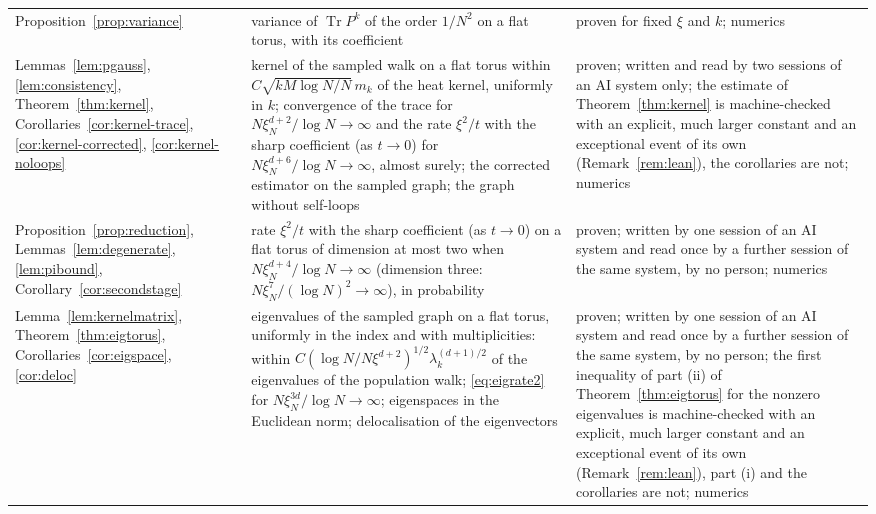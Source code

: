 \documentclass[11pt,a4paper]{article}
\theoremstyle{stmt}
\theoremstyle{defn}
\theoremstyle{rmk}
\numberwithin{equation}{section}
\DeclareMathOperator{\Tr}{Tr}
\begin{document}
{\begin{longtable}{@{}>{\raggedright\arraybackslash}p{}>{\raggedright\arraybackslash}p{}>{\raggedright\arraybackslash}p{}@{}}
Proposition~\ref{prop:variance} & variance of $\Tr P^k$ of the order $1/N^2$ on a flat torus, with its coefficient & proven for fixed $\xi$ and $k$; numerics\\
Lemmas~\ref{lem:pgauss}, \ref{lem:consistency}, Theorem~\ref{thm:kernel}, Corollaries~\ref{cor:kernel-trace}, \ref{cor:kernel-corrected}, \ref{cor:kernel-noloops} & kernel of the sampled walk on a flat torus within $C\sqrt{kM\log N/N}\,m_k$ of the heat kernel, uniformly in $k$; convergence of the trace for $N\xi_N^{d+2}/\log N\to\infty$ and the rate $\xi^2/t$ with the sharp coefficient (as $t\to0$) for $N\xi_N^{d+6}/\log N\to\infty$, almost surely; the corrected estimator on the sampled graph; the graph without self-loops & proven; written and read by two sessions of an AI system only; the estimate of Theorem~\ref{thm:kernel} is machine-checked with an explicit, much larger constant and an exceptional event of its own (Remark~\ref{rem:lean}), the corollaries are not; numerics\\
Proposition~\ref{prop:reduction}, Lemmas~\ref{lem:degenerate}, \ref{lem:pibound}, Corollary~\ref{cor:secondstage} & rate $\xi^2/t$ with the sharp coefficient (as $t\to0$) on a flat torus of dimension at most two when $N\xi_N^{d+4}/\log N\to\infty$ (dimension three: $N\xi_N^7/(\log N)^2\to\infty$), in probability & proven; written by one session of an AI system and read once by a further session of the same system, by no person; numerics\\
Lemma~\ref{lem:kernelmatrix}, Theorem~\ref{thm:eigtorus}, Corollaries~\ref{cor:eigspace}, \ref{cor:deloc} & eigenvalues of the sampled graph on a flat torus, uniformly in the index and with multiplicities: within $C(\log N/N\xi^{d+2})^{1/2}\lambda_k^{(d+1)/2}$ of the eigenvalues of the population walk; \eqref{eq:eigrate2} for $N\xi_N^{3d}/\log N\to\infty$; eigenspaces in the Euclidean norm; delocalisation of the eigenvectors & proven; written by one session of an AI system and read once by a further session of the same system, by no person; the first inequality of part (ii) of Theorem~\ref{thm:eigtorus} for the nonzero eigenvalues is machine-checked with an explicit, much larger constant and an exceptional event of its own (Remark~\ref{rem:lean}), part (i) and the corollaries are not; numerics\\

\end{longtable}}
\end{document}
